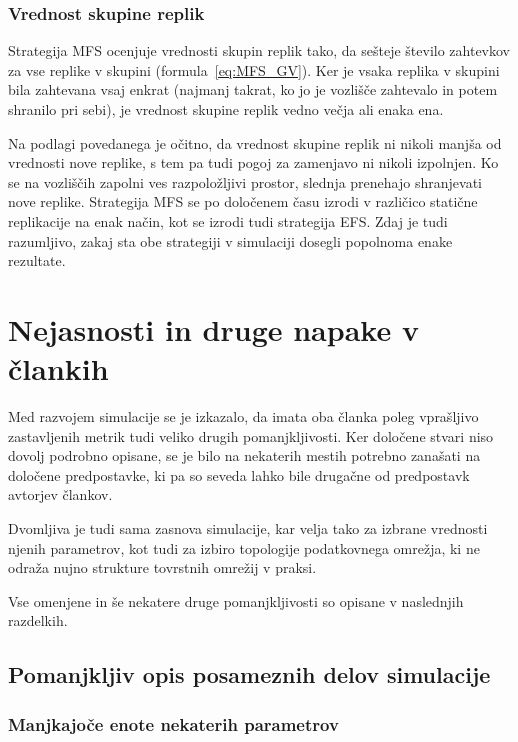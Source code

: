 \documentclass[a4paper, 12pt]{book}
\begin{document}
\subsubsection{Vrednost skupine replik}

Strategija MFS ocenjuje vrednosti skupin replik tako, da sešteje število
zahtevkov za vse replike v skupini (formula~\eqref{eq:MFS_GV}). Ker je
vsaka replika v skupini bila zahtevana vsaj enkrat (najmanj takrat, ko jo
je vozlišče zahtevalo in potem shranilo pri sebi), je vrednost skupine replik
vedno večja ali enaka ena.

Na podlagi povedanega je očitno, da vrednost skupine replik ni nikoli manjša
od vrednosti nove replike, s tem pa tudi pogoj za zamenjavo ni nikoli
izpolnjen. Ko se na vozliščih zapolni ves razpoložljivi prostor, slednja
prenehajo shranjevati nove replike. Strategija MFS se po določenem času
izrodi v različico statične replikacije na enak način, kot se izrodi
tudi strategija EFS. Zdaj je tudi razumljivo, zakaj sta obe strategiji v
simulaciji dosegli popolnoma enake rezultate.


\section{Nejasnosti in druge napake v člankih}

Med razvojem simulacije se je izkazalo, da imata oba članka poleg vprašljivo
zastavljenih metrik tudi veliko drugih pomanjkljivosti. Ker določene stvari
niso dovolj podrobno opisane, se je bilo na nekaterih mestih
potrebno zanašati na določene predpostavke, ki pa so seveda lahko bile
drugačne od predpostavk avtorjev člankov.

Dvomljiva je tudi sama zasnova simulacije, kar velja tako za izbrane
vrednosti njenih parametrov, kot tudi za izbiro topologije podatkovnega
omrežja, ki ne odraža nujno strukture tovrstnih omrežij v praksi.

Vse omenjene in še nekatere druge pomanjkljivosti so opisane v naslednjih
razdelkih.

\subsection{Pomanjkljiv opis posameznih delov simulacije}

\subsubsection{Manjkajoče enote nekaterih parametrov}
\end{document}
